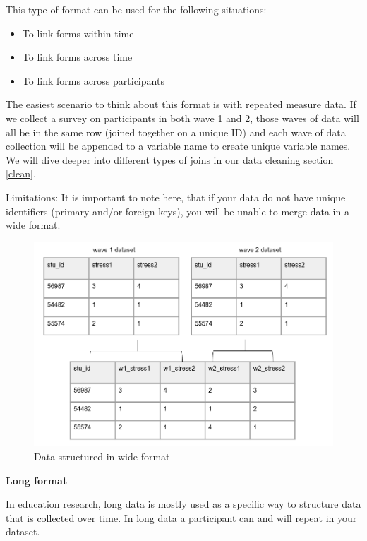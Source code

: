 \documentclass[
]{book}
\providecommand{\tightlist}{%
  \setlength{\itemsep}{0pt}\setlength{\parskip}{0pt}}
\begin{document}
This type of format can be used for the following situations:

\begin{itemize}
\tightlist
\item
  To link forms within time\\
\item
  To link forms across time\\
\item
  To link forms across participants
\end{itemize}

The easiest scenario to think about this format is with repeated measure data. If we collect a survey on participants in both wave 1 and 2, those waves of data will all be in the same row (joined together on a unique ID) and each wave of data collection will be appended to a variable name to create unique variable names. We will dive deeper into different types of joins in our data cleaning section \ref{clean}.

Limitations: It is important to note here, that if your data do not have unique identifiers (primary and/or foreign keys), you will be unable to merge data in a wide format.

\begin{figure}

{\centering \includegraphics[width=0.8\linewidth]{img/wide} 

}

\caption{Data structured in wide format}\label{fig:unnamed-chunk-12}
\end{figure}

\textbf{Long format}

In education research, long data is mostly used as a specific way to structure data that is collected over time. In long data a participant can and will repeat in your dataset.
\end{document}
